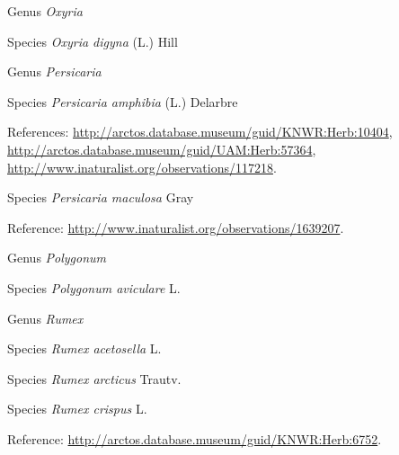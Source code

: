 \documentclass[9pt, article]{memoir}
\begin{document}
\begin{multicols}{2}
\vspace{6pt}\noindent\hspace{30pt}Genus \textit{Oxyria}


\vspace{6pt}\noindent\hspace{36pt}Species \textit{Oxyria digyna} (L.) Hill


\vspace{6pt}\noindent\hspace{30pt}Genus \textit{Persicaria}


\vspace{6pt}\noindent\hspace{36pt}Species \textit{Persicaria amphibia} (L.) Delarbre


\vspace{6pt}References: 
\url{http://arctos.database.museum/guid/KNWR:Herb:10404}, 
\url{http://arctos.database.museum/guid/UAM:Herb:57364}, 
\url{http://www.inaturalist.org/observations/117218}.

\vspace{6pt}\noindent\hspace{36pt}Species \textit{Persicaria maculosa} Gray


\vspace{6pt}Reference: 
\url{http://www.inaturalist.org/observations/1639207}.

\vspace{6pt}\noindent\hspace{30pt}Genus \textit{Polygonum}


\vspace{6pt}\noindent\hspace{36pt}Species \textit{Polygonum aviculare} L.


\vspace{6pt}\noindent\hspace{30pt}Genus \textit{Rumex}


\vspace{6pt}\noindent\hspace{36pt}Species \textit{Rumex acetosella} L.


\vspace{6pt}\noindent\hspace{36pt}Species \textit{Rumex arcticus} Trautv.


\vspace{6pt}\noindent\hspace{36pt}Species \textit{Rumex crispus} L.


\vspace{6pt}Reference: 
\url{http://arctos.database.museum/guid/KNWR:Herb:6752}.


\end{multicols}
\end{document}
